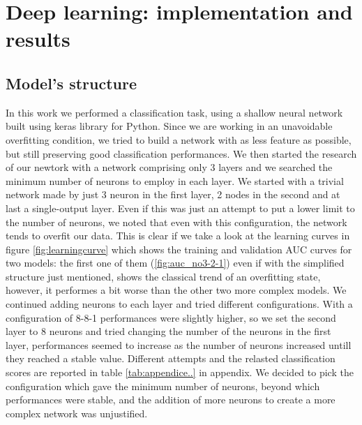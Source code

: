 \documentclass[10pt]{report}
\begin{document}
%






\newpage
\chapter{Deep learning: implementation and results} \label{sec:deep_learning_results}
\section{Model's structure}
In this work we performed a classification task, using a shallow neural network built using keras library for Python.
Since we are working in an unavoidable overfitting condition, we tried to build a network with as less feature as possible, but still preserving good classification performances.
We then started the research of our newtork with a network comprising only 3 layers and we searched the minimum number of neurons to employ in each layer.
We started with a trivial network made by just 3 neuron in the first layer, 2 nodes in the second and at last a single-output layer. Even if this was just an attempt to put a lower limit to the number of neurons, we noted that even with this configuration, the network tends to overfit our data.
This is clear if we take a look at the learning curves in figure \ref{fig:learningcurve} which shows the training and validation AUC curves for two models: the first one of them (\ref{fig:auc_no3-2-1}) even if with the simplified structure just mentioned, shows the classical trend of an overfitting state, however, it performes a bit worse than the other two more complex models.
We continued adding neurons to each layer and tried different configurations. With a configuration of 8-8-1 performances were slightly higher, so we set the second layer to 8 neurons and tried changing the number of the neurons in the first layer, performances seemed to increase as the number of neurons increased untill they reached a stable value. Different attempts and the relasted classification scores are reported in table \ref{tab:appendice..} in appendix.
We decided to pick the configuration which gave the minimum number of neurons, beyond which performances were stable, and the addition of more neurons to create a more complex network was unjustified.
\end{document}
